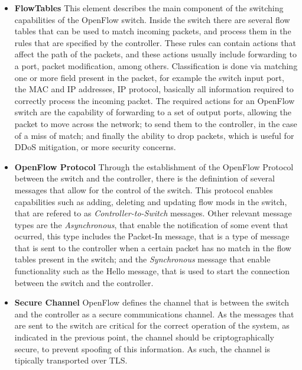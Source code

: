 \begin {itemize}
    \item \textbf {FlowTables} This element describes the main component of the switching capabilities of the OpenFlow switch. Inside the switch there are several flow tables that can be used to match incoming packets,
and process them in the rules that are specified by the controller. These rules can contain actions that affect the path of the packets, and these actions usually include forwarding to a port, packet modification, among
others. Classification is done via matching one or more field present in the packet, for example the switch input port, the MAC and IP addresses, IP protocol, basically all information required to correctly process the 
incoming packet. The required actions for an OpenFlow switch are the capability of forwarding to a set of output ports, allowing the packet to move across the network; to send them to the controller, in the case of a
miss of match; and finally the ability to drop packets, which is useful for DDoS mitigation, or more security concerns.
    \item \textbf {OpenFlow Protocol} Through the establishment of the OpenFlow Protocol between the switch and the controller, there is the definintion of several messages that allow for the control of the switch. This protocol
enables capabilities such as adding, deleting and updating flow mods in the switch, that are refered to as \textit {Controller-to-Switch} messages. Other relevant message types are the \textit {Asynchronous}, that enable the
notification of some event that ocurred, this type includes the Packet-In message, that is a type of message that is sent to the controller when a certain packet has no match in the flow tables present in the switch; and the 
\textit{ Synchronous} message that enable functionality such as the Hello message, that is used to start the connection between the switch and the controller.
    \item \textbf {Secure Channel} OpenFlow defines the channel that is between the switch and the controller as a secure communications channel. As the messages that are sent to the switch are critical for the correct operation 
of the system, as indicated in the previous point, the channel should be criptographically secure, to prevent spoofing of this information. As such, the channel is tipically transported over TLS.
\end {itemize}

